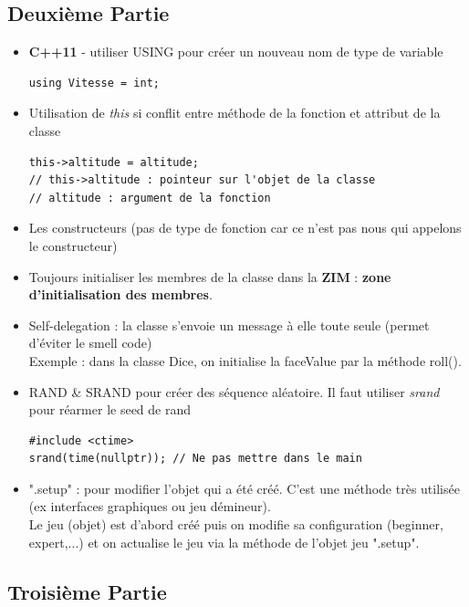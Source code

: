 \documentclass[12pt,a4paper]{article}
\begin{document}
\subsection{Deuxième Partie}
\begin{itemize}
\item \textbf{C++11} - utiliser USING pour créer un nouveau nom de type de variable
\begin{lstlisting}
using Vitesse = int;
\end{lstlisting}
\item Utilisation de \textit{this} si conflit entre méthode de la fonction et attribut de la classe
\begin{lstlisting}
this->altitude = altitude;
// this->altitude : pointeur sur l'objet de la classe
// altitude : argument de la fonction
\end{lstlisting}
\item Les constructeurs (pas de type de fonction car ce n'est pas nous qui appelons le constructeur)
\item Toujours initialiser les membres de la classe dans la \textbf{ZIM} : \textbf{zone d'initialisation des membres}.
\item Self-delegation : la classe s'envoie un message à elle toute seule (permet d'éviter le smell code)\\
Exemple : dans la classe Dice, on initialise la faceValue par la méthode roll().
\item RAND \& SRAND pour créer des séquence aléatoire. Il faut utiliser \textit{srand} pour réarmer le seed de rand
\begin{lstlisting}
#include <ctime>
srand(time(nullptr)); // Ne pas mettre dans le main
\end{lstlisting}
\item ".setup" : pour modifier l'objet qui a été créé. C'est une méthode très utilisée (ex interfaces graphiques ou jeu démineur).\\
Le jeu (objet) est d'abord créé puis on modifie sa configuration (beginner, expert,...) et on actualise le jeu via la méthode de l'objet jeu ".setup".
\end{itemize}

\subsection{Troisième Partie}
\end{document}
